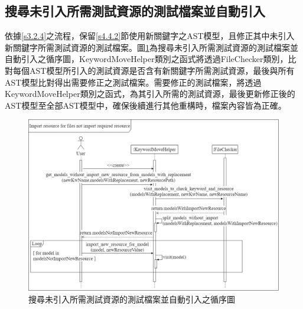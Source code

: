 \subsection{搜尋未引入所需測試資源的測試檔案並自動引入}
%
\indent
依據\ref{s3.2.4}之流程，保留\ref{s4.4.2}節使用新關鍵字之AST模型，且修正其中未引入新關鍵字所需測試資源的測試檔案。圖\ref{f4.6}為搜尋未引入所需測試資源的測試檔案並自動引入之循序圖，KeywordMoveHelper類別之函式將透過FileChecker類別，比對每個AST模型所引入的測試資源是否含有新關鍵字所需測試資源，最後與所有AST模型比對得出需要修正之測試檔案。需要修正的測試檔案，將透過KeywordMoveHelper類別之函式，為其引入所需的測試資源，最後更新修正後的AST模型至全部AST模型中，確保後續進行其他重構時，檔案內容皆為正確。

\begin{figure}[H]
	\centering
    \includegraphics[width=1.0\textwidth]{picture/ch4/sequenceDiagram/Import_resource_for_files_not_import_required_resource_sequence_diagram.png}
    \caption{搜尋未引入所需測試資源的測試檔案並自動引入之循序圖}
    \label{f4.6}
\end{figure}

